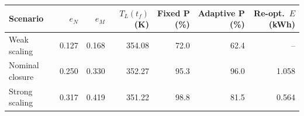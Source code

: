 \begin{tabular}{lrrrrrr}
\toprule
Scenario & $e_N$ & $e_M$ & $T_L(t_f)$ (K) & Fixed P (\%) & Adaptive P (\%) & Re-opt.\ $E$ (kWh) \\
\midrule
Weak scaling & 0.127 & 0.168 & 354.08 & 72.0 & 62.4 & -- \\
Nominal closure & 0.250 & 0.330 & 352.27 & 95.3 & 96.0 & 1.058 \\
Strong scaling & 0.317 & 0.419 & 351.22 & 98.8 & 81.5 & 0.564 \\
\bottomrule
\end{tabular}
